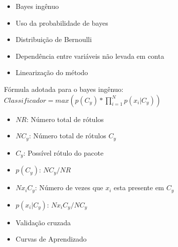 \begin{frame}

    \begin{itemize}
        \item Bayes ingênuo
        \item Uso da probabilidade de bayes
        \item Distribuição de Bernoulli
        \item Dependência entre variáveis não levada em conta
        \item Linearização do método
    \end{itemize}

\end{frame}

\begin{frame}

    Fórmula adotada para o bayes ingênuo:
    \newline
    \newline
    $Classificador = max(p(C_{y})*\prod_{i=1}^{N}p(x_{i}|C_{y}))$


    \begin{itemize}
        \item $NR$: Número total de rótulos
        \item $NC_{y}$: Número total de rótulos $C_{y}$
        \item $C_{y}$: Possível rótulo do pacote
        \item $p(C_{y})$: $NC_{y}/NR$
        \item $Nx_{i}C_{y}$: Número de vezes que $x_{i}$ esta presente em $C_{y}$
        \item $p(x_{i}|C_{y})$: $Nx_{i}C_{y}/NC_{y}$
    \end{itemize}


\end{frame}

\begin{frame}

    \begin{itemize}
        \item Validação cruzada
        \item Curvas de Aprendizado
    \end{itemize}

\end{frame}

